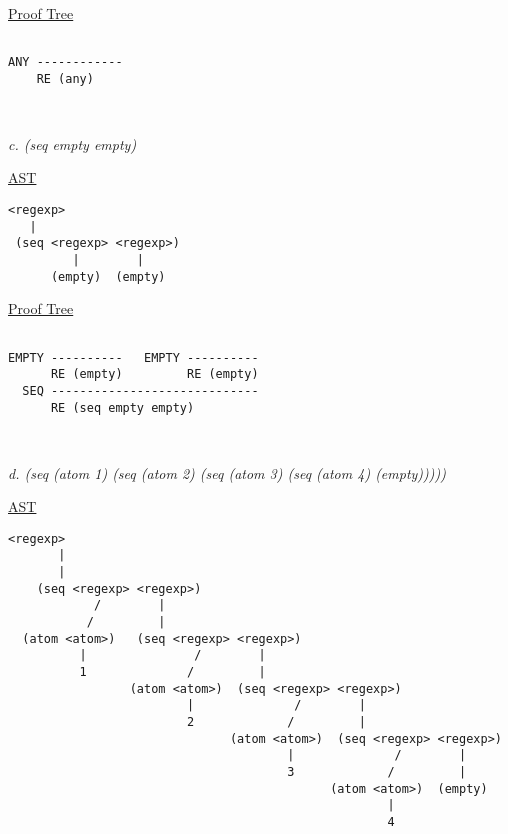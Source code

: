 \documentclass{article}
\begin{document}
\underline{Proof Tree}
\begin{lstlisting}[language=vasu]
    
ANY ------------
    RE (any)

 
\end{lstlisting}

\begin{quoting}
\textit{c. (seq empty empty)}
\end{quoting}

\underline{AST}
\begin{lstlisting}[language=vasu]
<regexp>
   |
 (seq <regexp> <regexp>)
         |        |
      (empty)  (empty)

\end{lstlisting}

\underline{Proof Tree}
\begin{lstlisting}[language=vasu]

EMPTY ----------   EMPTY ----------   
      RE (empty)         RE (empty)
  SEQ -----------------------------
      RE (seq empty empty)
      
      
\end{lstlisting}
\newpage

\begin{quoting}
\textit{d. (seq (atom 1) (seq (atom 2) (seq (atom 3) (seq (atom 4) (empty)))))}
\end{quoting}

\underline{AST}
\begin{lstlisting}[language=vasu]
    <regexp>
       |
       |
    (seq <regexp> <regexp>)
            /        |
           /         |
  (atom <atom>)   (seq <regexp> <regexp>)
          |               /        |
          1              /         |
                 (atom <atom>)  (seq <regexp> <regexp>)
                         |              /        |
                         2             /         |
                               (atom <atom>)  (seq <regexp> <regexp>)
                                       |              /        |
                                       3             /         |
                                             (atom <atom>)  (empty)
                                                     |              
                                                     4                   

\end{lstlisting}
\end{document}
